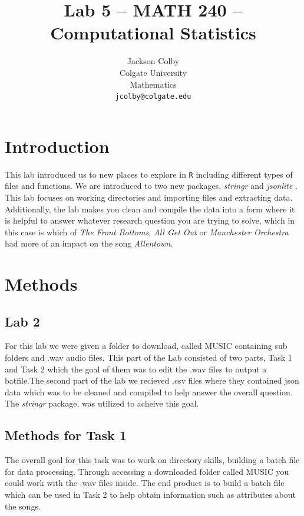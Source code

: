 \documentclass{article}\usepackage[]{graphicx}\usepackage[]{xcolor}
\begin{document}
\vspace{-1in}
\title{Lab 5 -- MATH 240 -- Computational Statistics}

\author{
  Jackson Colby \\
  Colgate University  \\
  Mathematics  \\
  {\tt jcolby@colgate.edu}
}

\date{}

\maketitle

\begin{multicols}{2}


\section{Introduction}
This lab introduced us to new places to explore in \texttt{R} including different types of files and functions. We are introduced to two new packages, \emph{stringr} \citep{stringr} and \emph{jsonlite} \citep{jsonlite}. This lab focuses on working directories and importing files and extracting data. Additionally, the lab makes you clean and compile the data into a form where it is helpful to answer whatever research question you are trying to solve, which in this case is which of \emph{The Front Bottoms}, \emph{All Get Out} or \emph{Manchester Orchestra} had more of an impact on the song \emph{Allentown}.

\section{Methods}

\subsection{Lab 2}
For this lab we were given a folder to download, called MUSIC containing sub folders and .wav audio files. This part of the Lab consisted of two parts, Task 1 and Task 2 which the goal of them was to edit the .wav files to output a batfile.The second part of the lab we recieved .csv files where they contained json data which was to be cleaned and compiled to help answer the overall question. The \emph{stringr} package, \citep{stringr} was utilized to acheive this goal.

\subsection{Methods for Task 1}
The overall goal for this task was to work on directory skills, building a batch file for data processing. Through accessing a downloaded folder called MUSIC you could work with the .wav files inside. The end product is to build a batch file which can be used in Task 2 to help obtain information such as attributes about the songs.

\end{multicols}
\end{document}
